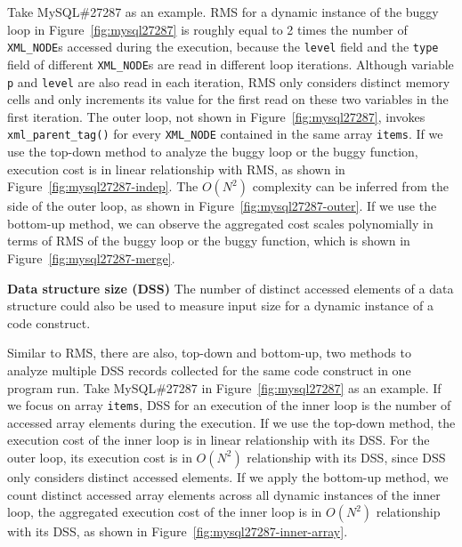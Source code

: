 Take MySQL\#27287 as an example.
RMS for a dynamic instance of
the buggy loop in Figure~\ref{fig:mysql27287}
is roughly equal to 2 times the number of \texttt{XML\_NODE}s 
accessed during the execution, 
because the \texttt{level} field and the \texttt{type} field of 
different \texttt{XML\_NODE}s are read in different loop iterations.
Although variable \texttt{p} and \texttt{level} are also read in each iteration,
RMS only considers distinct memory cells and 
only increments its value for the first read on these two variables in the first iteration. 
The outer loop, not shown in Figure~\ref{fig:mysql27287}, 
invokes \texttt{xml\_parent\_tag()} for every \texttt{XML\_NODE} contained
in the same array \texttt{items}.
If we use the top-down method to analyze the buggy loop
or the buggy function, 
execution cost is in linear relationship with RMS, 
as shown in Figure~\ref{fig:mysql27287-indep}.
The $O(N^2)$ complexity can be inferred from the side of the outer loop, 
as shown in Figure~\ref{fig:mysql27287-outer}. 
If we use the bottom-up method, 
we can observe the aggregated cost scales 
polynomially in terms of RMS of the buggy loop 
or the buggy function, 
which is shown in Figure~\ref{fig:mysql27287-merge}. 

\noindent\textbf{Data structure size (DSS)}
The number of distinct accessed elements of a data 
structure could also be used to measure 
input size for a dynamic instance of a code construct\cite{AlgoProf}. 

Similar to RMS, there are also, top-down and bottom-up, 
two methods to analyze 
multiple DSS records collected for the same code 
construct in one program run.
Take MySQL\#27287 in Figure~\ref{fig:mysql27287} as an example.
If we focus on array \texttt{items},
DSS for an execution of the inner loop is the number of 
accessed array elements during the execution.
If we use the top-down method, the execution cost 
of the inner loop is in linear relationship with its DSS.
For the outer loop, its execution cost is in $O(N^2)$ relationship with its DSS,
since DSS only considers distinct accessed elements.
If we apply the bottom-up method, 
we count distinct accessed array elements across all dynamic instances of the inner loop,
the aggregated execution cost of the inner loop is in $O(N^2)$ relationship with its DSS, 
as shown in Figure~\ref{fig:mysql27287-inner-array}.   

